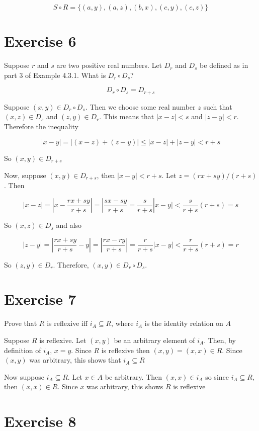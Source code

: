 \documentclass[11pt]{article}
\begin{document}
$$S \circ R = \{ (a, y), (a, z), (b, x), (c, y), (c, z) \}$$

\section*{Exercise 6}

Suppose $r$ and $s$ are two positive real numbers. Let $D_r$ and $D_s$ be defined
as in part 3 of Example 4.3.1. What is $D_r \circ D_s$? 

$$D_r \circ D_s = D_{r+s}$$

Suppose $(x, y) \in D_r \circ D_s$. Then we choose some real number $z$ such that 
$(x, z) \in D_s$ and $(z, y) \in D_r$. This means that $| x - z | < s$ and
$| z - y | < r$. Therefore the inequality

$$|x-y| = |(x -z) + (z-y)| \leq |x-z| + |z-y| < r + s$$

So $(x, y) \in D_{r+s}$

Now, suppose $(x, y) \in D_{r+s}$, then $|x-y| < r+s$. Let $z = (rx + sy) / (r+s)$.
Then 

$$|x-z| = | x - \frac{rx + sy}{r+s} | = | \frac{sx - sy}{r+s} = 
\frac{s}{r+s} | x-y | < \frac{s}{r+s} (r+s) = s$$

So $(x,z) \in D_s$ and also

$$|z-y| = | \frac{rx + sy}{r+s} - y| = | \frac{rx - ry}{r+s}| = \frac{r}{r+s} |x-y| < \frac{r}{r+s} (r+s) = r$$

So $(z,y) \in D_r$. Therefore, $(x, y) \in D_r \circ D_s$.

\section*{Exercise 7}

Prove that $R$ is reflexive iff $i_A \subseteq R$, where $i_A$ is the identity relation on $A$

Suppose $R$ is reflexive. Let $(x, y)$ be an arbitrary element of $i_A$. Then, 
by definition of $i_A$, $x = y$. Since $R$ is reflexive then $(x, y) = (x, x) \in R$.
Since $(x, y)$ was arbitrary, this shows that $i_A \subseteq R$

Now suppose $i_A \subseteq R$. Let $x \in A$ be arbitrary. Then $(x, x) \in i_A$
so since $i_A \subseteq R$, then $(x, x) \in R$. Since $x$ was arbitrary, this 
shows $R$ is reflexive

\section*{Exercise 8}
\end{document}
